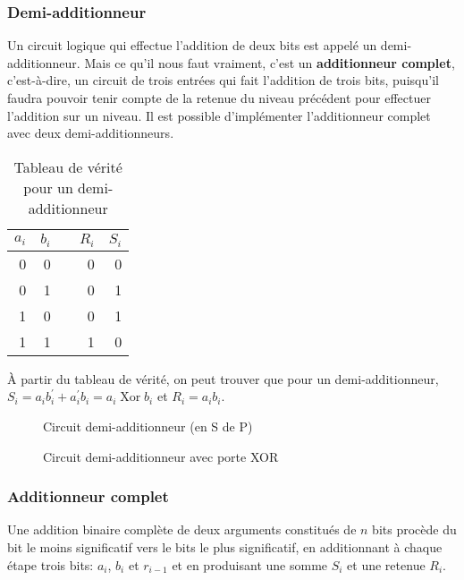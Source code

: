 \documentclass[11pt]{article}
\begin{document}
\subsubsection{Demi-additionneur}
\label{sec:org73f806b}

Un circuit logique qui effectue l'addition de deux bits est appelé un
demi-additionneur. Mais ce qu'il nous faut vraiment, c'est un
\textbf{additionneur complet}, c'est-à-dire, un circuit de trois entrées qui
fait l’addition de trois bits, puisqu'il faudra pouvoir tenir compte
de la retenue du niveau précédent pour effectuer l'addition sur un
niveau. Il est possible d'implémenter l'additionneur complet avec deux
demi-additionneurs.

\begin{table}[htbp]
\caption{\label{tab:org11ca066}Tableau de vérité pour un demi-additionneur}
\centering
\begin{tabular}{rrlrr}
\(a_{i}\) & \(b_{i}\) &  & \(R_{i}\) & \(S_{i}\)\\
\hline
0 & 0 &  & 0 & 0\\
0 & 1 &  & 0 & 1\\
1 & 0 &  & 0 & 1\\
1 & 1 &  & 1 & 0\\
\end{tabular}
\end{table}


À partir du tableau de vérité, on peut trouver que pour un
demi-additionneur, \(S_{i} = a_i b_i^\prime + a_i^\prime b_i = a_i
\operatorname{Xor} b_i\) et \(R_{i} = a_i b_i\).

\begin{figure}[htbp]
\centering

\caption{\label{fig:org8f57fc7}Circuit demi-additionneur (en S de P)}
\end{figure}


\begin{figure}[htbp]
\centering

\caption{\label{fig:orgd98ea6f}Circuit demi-additionneur avec porte XOR}
\end{figure}

\subsubsection{Additionneur complet}
\label{sec:orgd29cc69}

Une addition binaire complète de deux arguments constitués de \(n\)
bits procède du bit le moins significatif vers le bits le plus
significatif, en additionnant à chaque étape trois bits: \(a_{i}\),
\(b_{i}\) et \(r_{i-1}\) et en produisant une somme \(S_{i}\) et une
retenue \(R_{i}\).
\end{document}
